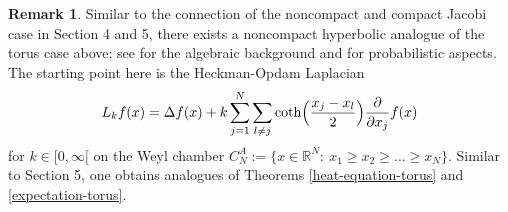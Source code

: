 \documentclass[reqno]{amsart}
\theoremstyle{plain}
\theoremstyle{definition}
\newtheorem{remark}[theorem]{Remark}
\numberwithin{equation}{section}
\begin{document}
\begin{remark} Similar to the connection of the noncompact and compact Jacobi case in Section 4 and 5, there exists a noncompact
hyperbolic  analogue of the torus case above; see \cite{HO, HS} for the algebraic background and \cite{Sch1,Sch2, RV2} for probabilistic aspects.
The starting point here is the Heckman-Opdam
Laplacian
  \begin{equation}
    L_kf(x)= \Delta f(x)+ k\sum_{j=1}^N \sum_{l\ne j}
    \coth\Bigl(\frac{x_j-x_l}{2}\Bigr)\frac{\partial}{\partial x_j}f(x)
   \end{equation}
for  $k\in[0,\infty[$ on the Weyl chamber
$C_N^A:=\{x\in \mathbb R^N:\> x_1\ge x_2\ge\ldots \ge x_N\}$. Similar to Section 5, one obtains analogues of Theorems \ref{heat-equation-torus}
and \ref{expectation-torus}.   \end{remark}
\end{document}
